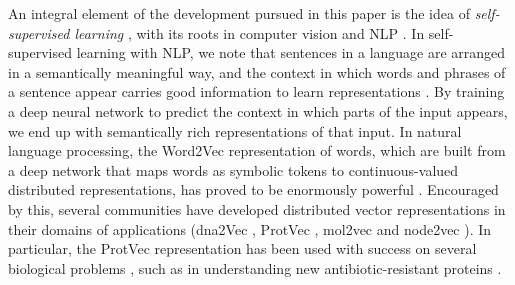 \documentclass[10pt,journal,compsoc,twoside]{IEEEtran}
\begin{document}
An integral element of the development pursued in this paper is the idea of \textit{self-supervised learning} \cite{representation-learning}, with its roots in computer vision \cite{imagenet_2015} and NLP \cite{nlp_fundamentals}. In self-supervised learning with NLP, we note that sentences in a language are arranged in a semantically meaningful way, and the context in which words and phrases of a sentence appear carries good information to learn representations \cite{representation-learning}. By training a deep neural network to predict the context in which parts of the input appears, we end up with semantically rich representations of that input. In natural language processing, the Word2Vec \cite{mikolov2013-original} representation of words, which are built from a deep network that maps words as symbolic tokens to continuous-valued distributed representations, has proved to be enormously powerful \cite{mikolov2013_2nd}. Encouraged by this, several communities have developed distributed vector representations in their domains of applications (dna2Vec \cite{dna2vec}, ProtVec \cite{protvec}, mol2vec \cite{mol2vec} and node2vec \cite{node2vec}). In particular, the ProtVec representation has been used with success on several biological problems \cite{protvec} \cite{tape}, such as in understanding new antibiotic-resistant proteins \cite{tape}.
\end{document}
